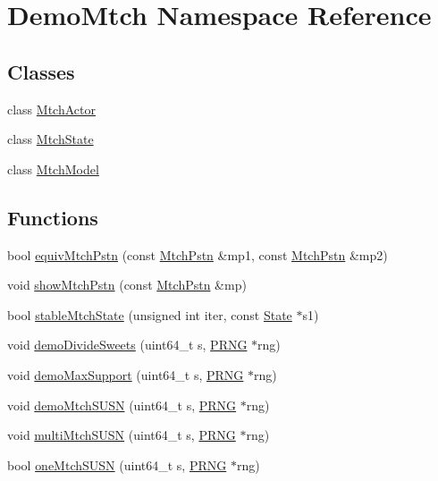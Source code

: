 \hypertarget{namespace_demo_mtch}{\section{Demo\-Mtch Namespace Reference}
\label{namespace_demo_mtch}
}
\subsection*{Classes}
\begin{DoxyCompactItemize}
\item 
class \hyperlink{class_demo_mtch_1_1_mtch_actor}{Mtch\-Actor}
\item 
class \hyperlink{class_demo_mtch_1_1_mtch_state}{Mtch\-State}
\item 
class \hyperlink{class_demo_mtch_1_1_mtch_model}{Mtch\-Model}
\end{DoxyCompactItemize}
\subsection*{Functions}
\begin{DoxyCompactItemize}
\item 
bool \hyperlink{namespace_demo_mtch_a5d3b0dc00a1fa682e2b8e772170b4cb1}{equiv\-Mtch\-Pstn} (const \hyperlink{class_k_base_1_1_mtch_pstn}{Mtch\-Pstn} \&mp1, const \hyperlink{class_k_base_1_1_mtch_pstn}{Mtch\-Pstn} \&mp2)
\item 
void \hyperlink{namespace_demo_mtch_a803b428fbd0ad7082387d8099ce82447}{show\-Mtch\-Pstn} (const \hyperlink{class_k_base_1_1_mtch_pstn}{Mtch\-Pstn} \&mp)
\item 
bool \hyperlink{namespace_demo_mtch_ae10e14c725c4989661f5757c16eb15b8}{stable\-Mtch\-State} (unsigned int iter, const \hyperlink{class_k_base_1_1_state}{State} $\ast$s1)
\item 
void \hyperlink{namespace_demo_mtch_a8e0f3441ffec0da131b39885648d7e26}{demo\-Divide\-Sweets} (uint64\-\_\-t s, \hyperlink{class_k_base_1_1_p_r_n_g}{P\-R\-N\-G} $\ast$rng)
\item 
void \hyperlink{namespace_demo_mtch_a8e9b3cbf75cade586730ed4dd18c2c6a}{demo\-Max\-Support} (uint64\-\_\-t s, \hyperlink{class_k_base_1_1_p_r_n_g}{P\-R\-N\-G} $\ast$rng)
\item 
void \hyperlink{namespace_demo_mtch_a37421abf25f54db93e10c23fde05d3a0}{demo\-Mtch\-S\-U\-S\-N} (uint64\-\_\-t s, \hyperlink{class_k_base_1_1_p_r_n_g}{P\-R\-N\-G} $\ast$rng)
\item 
void \hyperlink{namespace_demo_mtch_a407dabfea9990c7e8cc918088bd10c91}{multi\-Mtch\-S\-U\-S\-N} (uint64\-\_\-t s, \hyperlink{class_k_base_1_1_p_r_n_g}{P\-R\-N\-G} $\ast$rng)
\item 
bool \hyperlink{namespace_demo_mtch_adf5e1d1176afed04d9bb026d8b7f4d7d}{one\-Mtch\-S\-U\-S\-N} (uint64\-\_\-t s, \hyperlink{class_k_base_1_1_p_r_n_g}{P\-R\-N\-G} $\ast$rng)
\end{DoxyCompactItemize}


